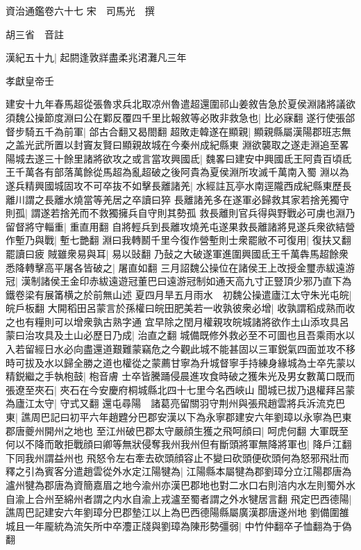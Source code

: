 資治通鑑卷六十七
宋　司馬光　撰

胡三省　音註

漢紀五十九|{
	起閼逢敦牂盡柔兆涒灘凡三年}


孝獻皇帝壬

建安十九年春馬超從張魯求兵北取凉州魯遣超還圍祁山姜敘告急於夏侯淵諸將議欲須魏公操節度淵曰公在鄴反覆四千里比報敘等必敗非救急也|{
	比必寐翻}
遂行使張郃督步騎五千為前軍|{
	郃古合翻又曷閤翻}
超敗走韓遂在顯親|{
	顯親縣屬漢陽郡班志無之盖光武所置以封竇友賢曰顯親故城在今秦州成紀縣東}
淵欲襲取之遂走淵追至畧陽城去遂三十餘里諸將欲攻之或言當攻興國氐|{
	魏畧曰建安中興國氐王阿貴百頃氐王千萬各有部落萬餘從馬超為亂超破之後阿貴為夏侯淵所攻滅千萬南入蜀}
淵以為遂兵精興國城固攻不可卒抜不如擊長離諸羌|{
	水經註瓦亭水南逕隴西成紀縣東歷長離川謂之長離水燒當等羌居之卒讀曰猝}
長離諸羌多在遂軍必歸救其家若捨羌獨守則孤|{
	謂遂若捨羌而不救獨擁兵自守則其勢孤}
救長離則官兵得與野戰必可虜也淵乃留督將守輜重|{
	重直用翻}
自將輕兵到長離攻燒羌屯遂果救長離諸將見遂兵衆欲結營作塹乃與戰|{
	塹七艷翻}
淵曰我轉鬭千里今復作營塹則士衆罷敝不可復用|{
	復扶又翻罷讀曰疲}
賊雖衆易與耳|{
	易以䜴翻}
乃鼔之大破遂軍進圍興國氐王千萬犇馬超餘衆悉降轉擊高平屠各皆破之|{
	屠直如翻}
三月詔魏公操位在諸侯王上改授金璽赤紱遠游冠|{
	漢制諸侯王金印赤紱遠遊冠董巴曰遠游冠制如通天高九寸正豎頂少邪乃直下為鐵卷梁有展筩横之於前無山述}
夏四月旱五月雨水　初魏公操遣廬江太守朱光屯皖|{
	皖戶板翻}
大開稻田呂蒙言於孫權曰皖田肥美若一收孰彼衆必增|{
	收孰謂稻成熟而收之也有糧則可以增衆孰古熟字通}
宜早除之閏月權親攻皖城諸將欲作土山添攻具呂蒙曰治攻具及土山必歷日乃成|{
	治直之翻}
城備既修外救必至不可圖也且吾乘雨水以入若留經日水必向盡還道艱難蒙竊危之今觀此城不能甚固以三軍鋭氣四面並攻不移時可拔及水以歸全勝之道也權從之蒙薦甘寧為升城督寧手持練身緣城為士卒先蒙以精鋭繼之手執枹鼓|{
	枹音膚}
士卒皆騰踊侵晨進攻食時破之獲朱光及男女數萬口既而張遼至夾石|{
	夾石在今安慶府桐城縣北四十七里今名西峽山}
聞城已拔乃退權拜呂蒙為廬江太守|{
	守式又翻}
還屯尋陽　諸葛亮留關羽守荆州與張飛趙雲將兵泝流克巴東|{
	譙周巴記曰初平六年趙韙分巴郡安漢以下為永寧郡建安六年劉璋以永寧為巴東郡唐夔州開州之地也}
至江州破巴郡太守嚴顔生獲之飛呵顔曰|{
	呵虎何翻}
大軍既至何以不降而敢拒戰顔曰卿等無狀侵奪我州我州但有斷頭將軍無降將軍也|{
	降戶江翻下同我州謂益州也}
飛怒令左右牽去砍頭顔容止不變曰砍頭便砍頭何為怒邪飛壯而釋之引為賓客分遣趙雲從外水定江陽犍為|{
	江陽縣本屬犍為郡劉璋分立江陽郡唐為瀘州犍為郡唐為資簡嘉眉之地今渝州亦漢巴郡地也對二水口右則涪内水左則蜀外水自渝上合州至綿州者謂之内水自渝上戎瀘至蜀者謂之外水犍居言翻}
飛定巴西德陽|{
	譙周巴記建安六年劉璋分巴郡墊江以上為巴西德陽縣屬廣漢郡唐遂州地}
劉備圍雒城且一年龎統為流矢所中卒灋正牋與劉璋為陳形勢彊弱|{
	中竹仲翻卒子恤翻為于偽翻}
